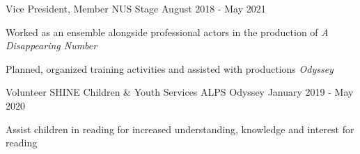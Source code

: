 

\begin{cventries}

  \cventry
    {Vice President, Member} %
    {NUS Stage} %
    {} %
    {August 2018 - May 2021} %
    {
      \begin{cvitems} %
        \item {Worked as an ensemble alongside professional actors in the production of \textcolor{eduDft-darkblue}{\textit{A Disappearing Number}}}
        \item {Planned, organized training activities and assisted with productions {\textit{Odyssey}}}
      \end{cvitems}
    }

  \cventry
    {Volunteer} %
    {SHINE Children \& Youth Services ALPS Odyssey} %
    {} %
    {January 2019 - May 2020} %
    {
      \begin{cvitems} %
        \item {Assist children in reading for increased understanding, knowledge and interest for reading}
      \end{cvitems}
    }

\end{cventries}
